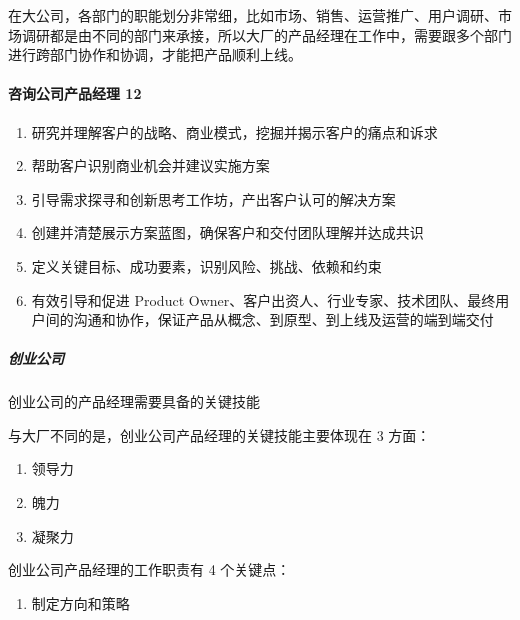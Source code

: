\documentclass[letterpaper,11pt,english]{sphinxmanual}
\begin{document}
在大公司，各部门的职能划分非常细，比如市场、销售、运营推广、用户调研、市场调研都是由不同的部门来承接，所以大厂的产品经理在工作中，需要跟多个部门进行跨部门协作和协调，才能把产品顺利上线。


\paragraph{咨询公司产品经理 12\sphinxfootnotemark[156]}
\label{\detokenize{chapter_introduction/PM:id42}}%
\begin{footnotetext}[156]\sphinxAtStartFootnote
{}
%
\end{footnotetext}\ignorespaces \begin{enumerate}
%
\item {} 
研究并理解客户的战略、商业模式，挖掘并揭示客户的痛点和诉求

\item {} 
帮助客户识别商业机会并建议实施方案

\item {} 
引导需求探寻和创新思考工作坊，产出客户认可的解决方案

\item {} 
创建并清楚展示方案蓝图，确保客户和交付团队理解并达成共识

\item {} 
定义关键目标、成功要素，识别风险、挑战、依赖和约束

\item {} 
有效引导和促进 Product
Owner、客户出资人、行业专家、技术团队、最终用户间的沟通和协作，保证产品从概念、到原型、到上线及运营的端到端交付

\end{enumerate}


\subparagraph{创业公司}
\label{\detokenize{chapter_introduction/PM:id43}}
创业公司的产品经理需要具备的关键技能

与大厂不同的是，创业公司产品经理的关键技能主要体现在 3 方面：
\begin{enumerate}
%
\item {} 
领导力

\item {} 
魄力

\item {} 
凝聚力

\end{enumerate}

创业公司产品经理的工作职责有 4 个关键点：
\begin{enumerate}
%
\item {} 
制定方向和策略

\end{enumerate}
\end{document}
